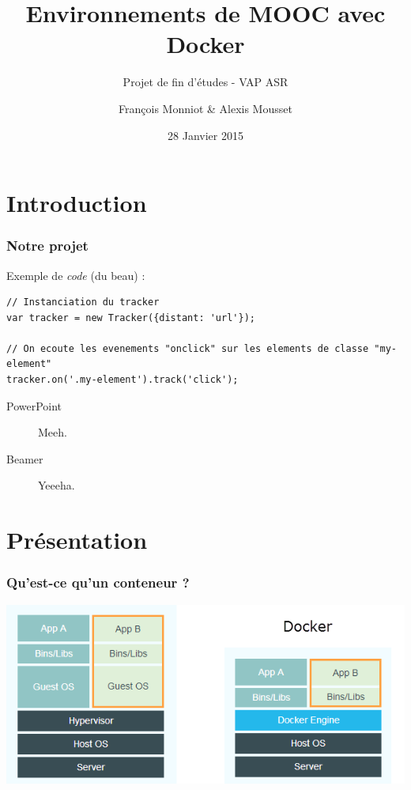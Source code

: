 \documentclass[10pt, compress]{beamer}
\title{Environnements de MOOC avec Docker}
\subtitle{Projet de fin d'études - VAP ASR}
\date{28 Janvier 2015}
\author{François Monniot \& Alexis Mousset}
\institute{Télécom SudParis}
\begin{document}
\maketitle

\section{Introduction}

\begin{frame}[fragile]
  \frametitle{Notre projet}

  Exemple de \emph{code} (du \alert{beau}) :

  \begin{verbatim}
// Instanciation du tracker
var tracker = new Tracker({distant: 'url'});

// On ecoute les evenements "onclick" sur les elements de classe "my-element"
tracker.on('.my-element').track('click');
  \end{verbatim}
  \begin{description}
    \item[PowerPoint] Meeh.
    \item[Beamer] Yeeeha.
  \end{description}
\end{frame}

\section{Présentation}

\begin{frame}[fragile]
  \frametitle{Qu'est-ce qu'un conteneur ?}
  \begin{center}
  
 
  \includegraphics[scale = 0.5]{dockervsvm.png}
   \end{center}
\end{frame}
\end{document}
